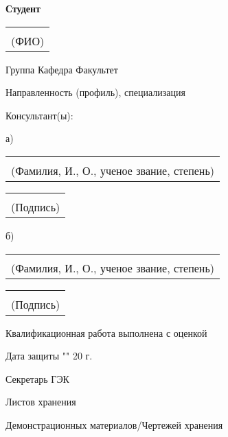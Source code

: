 \thispagestyle{empty}
\textbf{Студент} \begin{tabular}[t]{c} \underline{\hspace{5cm}} \\ {\scriptsize(ФИО)} \\ \end{tabular} Группа \underline{\hspace{2cm}} Кафедра\underline{\hspace{2cm}} Факультет \underline{\hspace{2cm}}

\bigskip

Направленность (профиль), специализация \underline{\hspace{10.5cm}}

\bigskip

Консультант(ы):

а)
\begin{tabular}[t]{c} \underline{\hspace{13.2cm}} \\ {\scriptsize(Фамилия, И., О., ученое звание, степень)} \\ \end{tabular} \begin{tabular}[t]{c} \underline{\hspace{3cm}} \\ {\scriptsize(Подпись)} \\ \end{tabular}

\bigskip

б)
\begin{tabular}[t]{c} \underline{\hspace{13.2cm}} \\ {\scriptsize(Фамилия, И., О., ученое звание, степень)} \\ \end{tabular} \begin{tabular}[t]{c} \underline{\hspace{3cm}} \\ {\scriptsize(Подпись)} \\ \end{tabular}

\vspace{2cm}

Квалификационная работа выполнена с оценкой \underline{\hspace{5cm}}


\vspace{1cm}

Дата защиты "\underline{\hspace{0.5cm}}" \underline{\hspace{4cm}} 20 \underline{\hspace{1cm}}г. \hspace{0.3cm}

\vspace{1cm}

Секретарь ГЭК \underline{\hspace{5.2cm}}

\vspace{1cm}

Листов хранения \underline{\hspace{5cm}}

\vspace{1cm}

Демонстрационных материалов/Чертежей хранения \underline{\hspace{5cm}}
